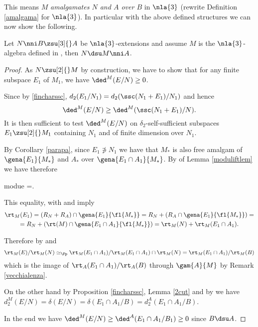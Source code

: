 This means $M$ {\em amalgamates $N$ and $A$ over $B$} in $\nla{3}$ (rewrite Definition \ref{amalgama} for $\nla{3}$).
In particular with the above defined structures we can
now show the following.
\begin{lem}\label{amalgatrestrong}
Let $N\nni B\zsu[3]{}A$ be $\nla{3}$-extensions and assume $M$ is the $\nla{3}$-algebra defined in ,
then $N\dsu M\nni A$.
\end{lem}
\begin{proof}
As $N\zsu[2]{}M$ by construction, we have to show that for any finite subspace $E_{1}$ of $M_{1}$, we have $\ded^{M}(E/N)\geq0$.

Since by \ref{fincharssc}, $d_{2}(E_{1}/N_{1})=d_{2}(\ssc(N_{1}+E_{1})/N_{1})$ and hence
$$\ded^{M}(E/N)\geq\ded^{M}(\ssc(N_{1}+E_{1})/N).$$
It is then sufficient to test $\ded^{M}(E/N)$ on $\delta_{2}$-self-sufficient subspaces $E_{1}\zsu[2]{}M_{1}$ containing $N_{1}$ and
of finite dimension over $N_{1}$.

By Corollary \ref{parapa}, since $E_{1}\nni N_{1}$ we have that $M_{*}$ is also free amalgam of $\gena{E_{1}}{M_{*}}$ and $A_{*}$ over
$\gena{E_{1}\cap A_{1}}{M_{*}}$.
By  of Lemma \ref{moduliftlem} we have therefore
\begin{labeq}{modue}
\cap{}=.
\end{labeq}

This equality, with  and  imply
\begin{multline*}
\rt_{M}(E_{1})=(R_{N}+R_{A})\cap\gena{E_{1}}{\fl{M_{*}}}=R_{N}+(R_{A}\cap
\gena{E_{1}}{\fl{M_{*}}})=\\=
R_{N}+(\rt(M)\cap\gena{E_{1}\cap A_{1}}{\fl{M_{*}}})=\rt_{M}(N)+\rt_{M}(E_{1}\cap A_{1}).
\end{multline*}

Therefore by %
 and 
$$\rt_{M}(E)/ \rt_{M}(N)\simeq_{\Fp}
\rt_{M}(E_{1}\cap A_{1})/\rt_{M}(E_{1}\cap A_{1})\cap\rt_{M}(N)
=\rt_{M}(E_{1}\cap A_{1})/\rt_{M}(B)$$
which is the image of  $\rt_{A}(E_{1}\cap A_{1})/ \rt_{A}(B)$ through $\gam{A}{M}$ by Remark \ref{vecchialenza}.

\smallskip
On the other hand by Proposition \ref{fincharssc}, Lemma \ref{2cut} and by 
we have $d_{2}^{M}(E / N)=\delta(E/N)=\delta(E_{1}\cap A_{1}/B)=d_{2}^{A}(E_{1}\cap A_{1}/ B)$.

In the end we have $\ded^{M}(E/N)\geq\ded^{A}(E_{1}\cap A_{1}/B_{1})\geq0$ since $B\dsu A$.
\end{proof}
